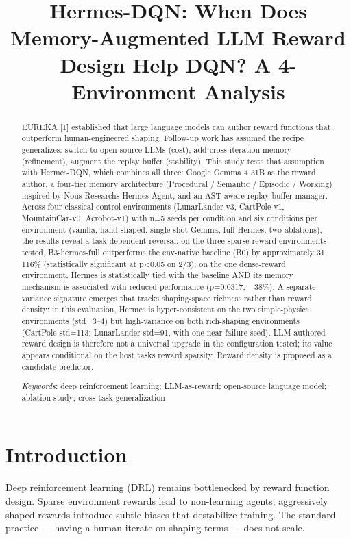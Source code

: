 \documentclass[conference,letterpaper,10pt]{IEEEtran}
\title{Hermes-DQN: When Does Memory-Augmented LLM Reward Design Help DQN? A 4-Environment Analysis}
\author{\IEEEauthorblockN{ShengMao Chen, Hsienan Lin, YuJou Hsin, KuanYu Chen}
\IEEEauthorblockA{Department of Management Information Systems\\
National Chung Hsing University}}
\begin{document}
\maketitle
\thispagestyle{plain}

\begin{abstract}
EUREKA {[}1{]} established that large language models can author reward functions that outperform human-engineered shaping. Follow-up work has assumed the recipe generalizes: switch to open-source LLMs (cost), add cross-iteration memory (refinement), augment the replay buffer (stability). This study tests that assumption with Hermes-DQN, which combines all three: Google Gemma 4 31B as the reward author, a four-tier memory architecture (Procedural / Semantic / Episodic / Working) inspired by Nous Research\textquotesingle s Hermes Agent, and an AST-aware replay buffer manager. Across four classical-control environments (LunarLander-v3, CartPole-v1, MountainCar-v0, Acrobot-v1) with n=5 seeds per condition and six conditions per environment (vanilla, hand-shaped, single-shot Gemma, full Hermes, two ablations), the results reveal a task-dependent reversal: on the three sparse-reward environments tested, B3-hermes-full outperforms the env-native baseline (B0) by approximately 31--116\% (statistically significant at p\textless0.05 on 2/3); on the one dense-reward environment, Hermes is statistically tied with the baseline AND its memory mechanism is associated with reduced performance (p=0.0317, −38\%). A separate variance signature emerges that tracks shaping-space richness rather than reward density: in this evaluation, Hermes is hyper-consistent on the two simple-physics environments (std=3--4) but high-variance on both rich-shaping environments (CartPole std=113; LunarLander std=91, with one near-failure seed). LLM-authored reward design is therefore not a universal upgrade in the configuration tested; its value appears conditional on the host task\textquotesingle s reward sparsity. Reward density is proposed as a candidate predictor.

\emph{Keywords}: deep reinforcement learning; LLM-as-reward; open-source language model; ablation study; cross-task generalization
\end{abstract}

\section{Introduction}

Deep reinforcement learning (DRL) remains bottlenecked by reward function design. Sparse environment rewards lead to non-learning agents; aggressively shaped rewards introduce subtle biases that destabilize training. The standard practice --- having a human iterate on shaping terms --- does not scale.
\end{document}
